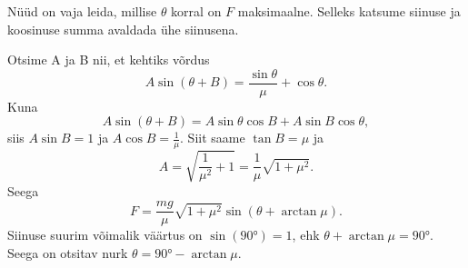 Nüüd on vaja leida, millise $\theta$ korral on $F$ maksimaalne. Selleks katsume siinuse ja koosinuse summa avaldada ühe siinusena. 

Otsime A ja B nii, et kehtiks võrdus 
\[
A\sin (\theta+B)=\frac{\sin\theta}{\mu}+\cos\theta.
\]
Kuna 
\[
A\sin (\theta+B)=A\sin\theta\cos B + A\sin B \cos\theta,
\]
siis 
$A\sin B=1$ ja $A\cos B=\frac{1}{\mu}$. Siit saame $\tan B=\mu$ ja 
\[
A=\sqrt{\frac{1}{{\mu}^2} + 1}=\frac{1}{\mu}\sqrt{1+{\mu}^2}.
\]
Seega 
\[
F=\frac{mg}{\mu}\sqrt{1+{\mu}^2}\sin(\theta + \arctan\mu).
\]
Siinuse suurim võimalik väärtus on $\sin(\ang{90})=1$, ehk $\theta + \arctan\mu=\ang{90}$. Seega on otsitav nurk $\theta = \ang{90}-\arctan\mu$.
\probend